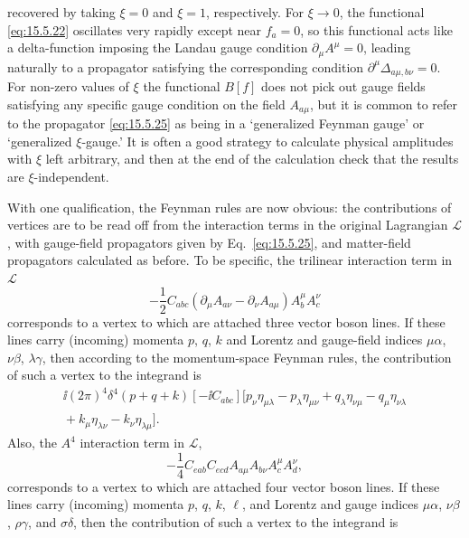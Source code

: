 recovered by taking $\xi=0$ and $\xi=1$, respectively. For $\xi\to0$, the
functional \eqref{eq:15.5.22} oscillates very rapidly except near $f_a=0$,
so this functional acts like a delta-function imposing the Landau gauge
condition $\partial_\mu A^\mu=0$, leading naturally to a propagator satisfying
the corresponding condition $\partial^\mu\Delta_{a\mu,b\nu}=0$. For
non-zero values of $\xi$ the functional $B[f]$ does not pick out gauge fields
satisfying any specific gauge condition on the field $A_{a\mu}$, but it is
common to refer to the propagator \eqref{eq:15.5.25} as being in a `generalized
Feynman gauge' or `generalized $\xi$-gauge.' It is often a good strategy to
calculate physical amplitudes with $\xi$ left arbitrary, and then at the end of
the calculation check that the results are $\xi$-independent.

With one qualification, the Feynman rules are now obvious: the contributions
of vertices are to be read off from the interaction terms in the original
Lagrangian $\mathcal L$, with gauge-field propagators given by
Eq.~\eqref{eq:15.5.25}, and matter-field propagators calculated as before. To
be specific, the trilinear interaction term in $\mathcal L$
\begin{equation*}
  -\frac12C_{abc}
  (\partial_\mu A_{a\nu}-\partial_\nu A_{a\mu})
  A_b^\mu A_c^\nu
\end{equation*}
corresponds to a vertex to which are attached three vector boson lines. If
these lines carry (incoming) momenta $p$, $q$, $k$ and Lorentz and gauge-field
indices $\mu\alpha$, $\nu\beta$, $\lambda\gamma$, then according to the
momentum-space Feynman rules, the contribution of such a vertex to the
integrand is
\begin{multline}
  \ii(2\pi)^4\delta^4(p+q+k)[-\ii C_{abc}]
  \bigl[p_\nu\eta_{\mu\lambda}-p_\lambda\eta_{\mu\nu}
  +q_\lambda\eta_{\nu\mu}-q_\mu\eta_{\nu\lambda}\\
  {}+k_\mu\eta_{\lambda\nu}-k_\nu\eta_{\lambda\mu}\bigr].
  \tag{15.5.26}\label{eq:15.5.26}
\end{multline}
Also, the $A^4$ interaction term in $\mathcal L$,
\begin{equation*}
  -\frac14C_{eab}C_{ecd}
  A_{a\mu}A_{b\nu}A_c^\mu A_d^\nu,
\end{equation*}
corresponds to a vertex to which are attached four vector boson lines. If these
lines carry (incoming) momenta $p$, $q$, $k$, $\ell$, and Lorentz and gauge
indices $\mu\alpha$, $\nu\beta$, $\rho\gamma$, and $\sigma\delta$, then the
contribution of such a vertex to the integrand is
